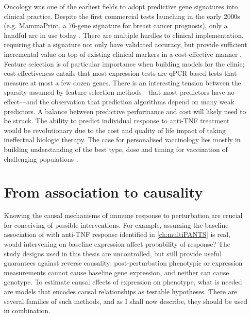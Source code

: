 Oncology was one of the earliest fields to adopt predictive gene signatures into clinical practice.
Despite the first commercial tests launching in the early 2000s (e.g. MammaPrint, a 76-gene signature for breast cancer prognosis),
only a handful are in use today \autocite{chibon2013CancerGeneExpression,michiels2016StatisticalControversiesClinical,kwa2017ClinicalUtilityGeneexpression}. 
There are multiple hurdles to clinical implementation,
requiring that a signature not only have validated accuracy, 
but provide sufficient incremental value on top of existing clinical markers in a cost-effective manner \autocite{michiels2016StatisticalControversiesClinical}.
Feature selection is of particular importance when building models for the clinic; 
cost-effectiveness entails that most expression tests are qPCR-based tests that measure at most a few dozen genes.
There is an interesting tension between the sparsity assumed by feature selection methods---that most predictors have no effect---and the observation that prediction algorithms depend on many weak predictors.
A balance between predictive performance and cost will likely need to be struck.
The ability to predict individual response to anti-\gls{TNF} treatment would be revolutionary due to the cost and quality of life impact of taking ineffectual biologic therapy.
The case for personalised vaccinology lies mostly in building understanding of the best type, dose and timing for vaccination of challenging populations \autocite{poland2018PersonalizedVaccinologyReview}.

%

\section{From association to causality}

Knowing the causal mechanisms of immune response to perturbation are crucial for conceiving of possible interventions.
For example, assuming the baseline association of  with anti-\gls{TNF} response identified in \cref{ch:multiPANTS} is real,
would intervening on baseline  expression affect probability of response?
The study designs used in this thesis are uncontrolled, but still provide useful guarantees against reverse causality:
post-perturbation phenotypic or expression measurements cannot cause baseline gene expression,
and neither can cause genotype.
To estimate causal effects of expression on phenotype,
what is needed are models that encodes causal relationships as testable hypotheses.
There are several families of such methods, and as I shall now describe, they should be used in combination.

